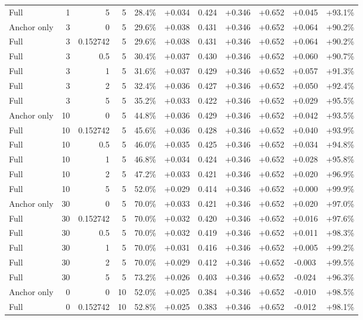 \begin{table}[htbp]
\begin{tabular}{lrrrccccccc}
Full & 1 & 5 & 5 & 28.4\% & +0.034 & 0.424 & +0.346 & +0.652 & +0.045 & +93.1\% \\
Anchor only & 3 & 0 & 5 & 29.6\% & +0.038 & 0.431 & +0.346 & +0.652 & +0.064 & +90.2\% \\
Full & 3 & 0.152742 & 5 & 29.6\% & +0.038 & 0.431 & +0.346 & +0.652 & +0.064 & +90.2\% \\
Full & 3 & 0.5 & 5 & 30.4\% & +0.037 & 0.430 & +0.346 & +0.652 & +0.060 & +90.7\% \\
Full & 3 & 1 & 5 & 31.6\% & +0.037 & 0.429 & +0.346 & +0.652 & +0.057 & +91.3\% \\
Full & 3 & 2 & 5 & 32.4\% & +0.036 & 0.427 & +0.346 & +0.652 & +0.050 & +92.4\% \\
Full & 3 & 5 & 5 & 35.2\% & +0.033 & 0.422 & +0.346 & +0.652 & +0.029 & +95.5\% \\
Anchor only & 10 & 0 & 5 & 44.8\% & +0.036 & 0.429 & +0.346 & +0.652 & +0.042 & +93.5\% \\
Full & 10 & 0.152742 & 5 & 45.6\% & +0.036 & 0.428 & +0.346 & +0.652 & +0.040 & +93.9\% \\
Full & 10 & 0.5 & 5 & 46.0\% & +0.035 & 0.425 & +0.346 & +0.652 & +0.034 & +94.8\% \\
Full & 10 & 1 & 5 & 46.8\% & +0.034 & 0.424 & +0.346 & +0.652 & +0.028 & +95.8\% \\
Full & 10 & 2 & 5 & 47.2\% & +0.033 & 0.421 & +0.346 & +0.652 & +0.020 & +96.9\% \\
Full & 10 & 5 & 5 & 52.0\% & +0.029 & 0.414 & +0.346 & +0.652 & +0.000 & +99.9\% \\
Anchor only & 30 & 0 & 5 & 70.0\% & +0.033 & 0.421 & +0.346 & +0.652 & +0.020 & +97.0\% \\
Full & 30 & 0.152742 & 5 & 70.0\% & +0.032 & 0.420 & +0.346 & +0.652 & +0.016 & +97.6\% \\
Full & 30 & 0.5 & 5 & 70.0\% & +0.032 & 0.419 & +0.346 & +0.652 & +0.011 & +98.3\% \\
Full & 30 & 1 & 5 & 70.0\% & +0.031 & 0.416 & +0.346 & +0.652 & +0.005 & +99.2\% \\
Full & 30 & 2 & 5 & 70.0\% & +0.029 & 0.412 & +0.346 & +0.652 & -0.003 & +99.5\% \\
Full & 30 & 5 & 5 & 73.2\% & +0.026 & 0.403 & +0.346 & +0.652 & -0.024 & +96.3\% \\
Anchor only & 0 & 0 & 10 & 52.0\% & +0.025 & 0.384 & +0.346 & +0.652 & -0.010 & +98.5\% \\
Full & 0 & 0.152742 & 10 & 52.8\% & +0.025 & 0.383 & +0.346 & +0.652 & -0.012 & +98.1\% \\

\end{tabular}
\end{table}
